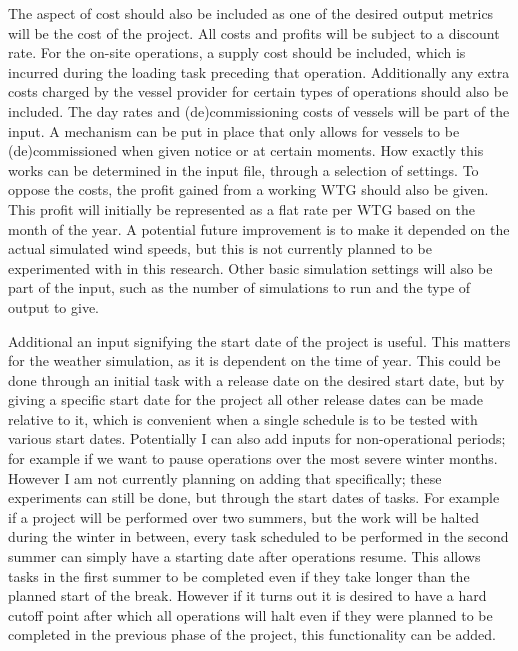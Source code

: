 \documentclass[a4paper,12pt]{article}
\begin{document}
The aspect of cost should also be included as one of the desired output metrics will be the cost of the project. All costs and profits will be subject to a discount rate. For the on-site operations, a supply cost should be included, which is incurred during the loading task preceding that operation. Additionally any extra costs charged by the vessel provider for certain types of operations should also be included. The day rates and (de)commissioning costs of vessels will be part of the input. A mechanism can be put in place that only allows for vessels to be (de)commissioned when given notice or at certain moments. How exactly this works can be determined in the input file, through a selection of settings. To oppose the costs, the profit gained from a working WTG should also be given. This profit will initially be represented as a flat rate per WTG based on the month of the year. A potential future improvement is to make it depended on the actual simulated wind speeds, but this is not currently planned to be experimented with in this research. Other basic simulation settings will also be part of the input, such as the number of simulations to run and the type of output to give.

Additional an input signifying the start date of the project is useful. This matters for the weather simulation, as it is dependent on the time of year. This could be done through an initial task with a release date on the desired start date, but by giving a specific start date for the project all other release dates can be made relative to it, which is convenient when a single schedule is to be tested with various start dates. Potentially I can also add inputs for non-operational periods; for example if we want to pause operations over the most severe winter months. However I am not currently planning on adding that specifically; these experiments can still be done, but through the start dates of tasks. For example if a project will be performed over two summers, but the work will be halted during the winter in between, every task scheduled to be performed in the second summer can simply have a starting date after operations resume. This allows tasks in the first summer to be completed even if they take longer than the planned start of the break. However if it turns out it is desired to have a hard cutoff point after which all operations will halt even if they were planned to be completed in the previous phase of the project, this functionality can be added. 
\end{document}
